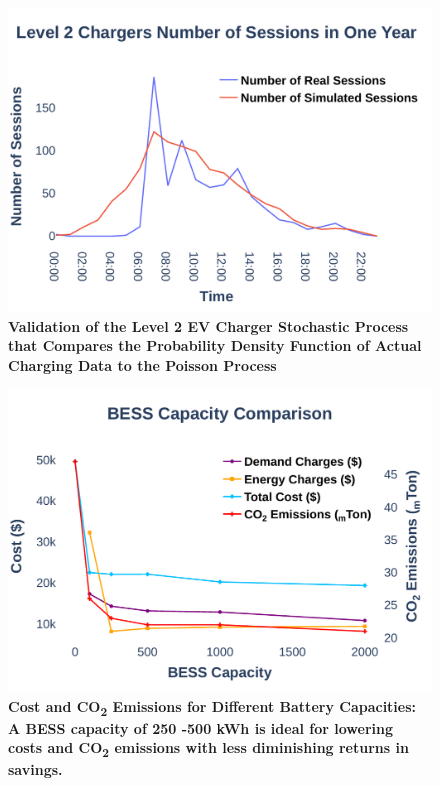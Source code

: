 \documentclass[final, 36 pt]{beamer}
\newlength{\onecolwid}
\begin{document}
\begin{frame}[t]
\begin{columns}[t]
\begin{column}{\onecolwid}
\begin{block}{}
		\begin{figure}[!htb] 		
			\centering
			\includegraphics[width=0.87\linewidth]{Fig/l2_avg_day_rand_poisson_1_hour_big}
			\caption{\large \bf {Validation of the Level 2 EV Charger Stochastic Process that Compares the Probability Density Function of Actual Charging Data to the Poisson Process}}
			\label{fig:l2avgdayrandpoisson1hourpdf}
		\end{figure}
		\begin{figure}[!htb] 		
		\includegraphics[width=0.87\linewidth]{Fig/bess_capacity_comparison_large_font}
		\caption{\large \bf{Cost and CO\textsubscript{2} Emissions for Different Battery Capacities: A BESS capacity of 250 -500 kWh is ideal for lowering costs and CO\textsubscript{2} emissions with less diminishing returns in savings.}}
		\label{fig:besscapacitycomparison}		
	\end{figure}
\end{block}


\end{column}
\end{columns}
\end{frame}
\end{document}
